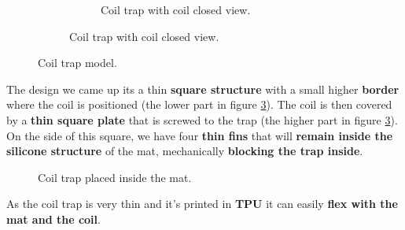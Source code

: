 \begin{figure}[H]
\begin{subfigure}[b]{0.8\linewidth}
\begin{subfigure}[b]{0.475\textwidth}
            \caption{Coil trap with coil closed view.}
            \label{fig: coil_trap_closed}
        \end{subfigure}
    \end{subfigure}   
    \caption{Coil trap model.}
    \label{fig: mat_mold_core_trap}
\end{figure}

The design we came up its a thin \textbf{square structure} with a small higher \textbf{border} where the coil is positioned (the lower part in figure \ref{fig: mat_mold_core_trap}).
The coil is then covered by a \textbf{thin square plate} that is screwed to the trap (the higher part in figure \ref{fig: mat_mold_core_trap}).
On the side of this square, we have four \textbf{thin fins} that will \textbf{remain inside the silicone structure} of the mat, mechanically \textbf{blocking the trap inside}.
\begin{figure}[H]
    \centering
    \caption{Coil trap placed inside the mat.}
    \label{fig: coil_trap_in_mat}
\end{figure}
As the coil trap is very thin and it's printed in \textbf{TPU} it can easily \textbf{flex with the mat and the coil}.

